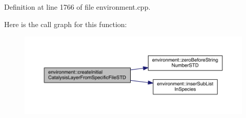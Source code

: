 Definition at line 1766 of file environment.\+cpp.



Here is the call graph for this function\+:\nopagebreak
\begin{figure}[H]
\begin{center}
\leavevmode
\includegraphics[width=350pt]{a00013_a6dd31bae82367ebe7d6a6bb062b8cd07_cgraph}
\end{center}
\end{figure}


